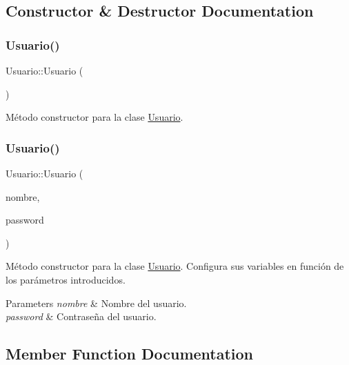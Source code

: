\subsection{Constructor \& Destructor Documentation}
\mbox{\label{classUsuario_aa85a5371a098dfba5449140d9b8a472f}} 
\subsubsection{\texorpdfstring{Usuario()}{Usuario()}\hspace{0.1cm}{\footnotesize\ttfamily [1/2]}}
{\footnotesize\ttfamily Usuario\+::\+Usuario (\begin{DoxyParamCaption}{ }\end{DoxyParamCaption})}

Método constructor para la clase \mbox{\hyperlink{classUsuario}{Usuario}}. \mbox{\label{classUsuario_a21975acad49ffd19aa3cf818d03527ad}} 
\subsubsection{\texorpdfstring{Usuario()}{Usuario()}\hspace{0.1cm}{\footnotesize\ttfamily [2/2]}}
{\footnotesize\ttfamily Usuario\+::\+Usuario (\begin{DoxyParamCaption}\item[{Q\+String}]{nombre,  }\item[{Q\+String}]{password }\end{DoxyParamCaption})}

Método constructor para la clase \mbox{\hyperlink{classUsuario}{Usuario}}. Configura sus variables en función de los parámetros introducidos. 
\begin{DoxyParams}{Parameters}
{\em nombre} & Nombre del usuario. \\
\hline
{\em password} & Contraseña del usuario. \\
\hline
\end{DoxyParams}


\subsection{Member Function Documentation}
\mbox{\label{classUsuario_a708f7cbd127ba0f9a91a1b5c681fa5e7}} 
